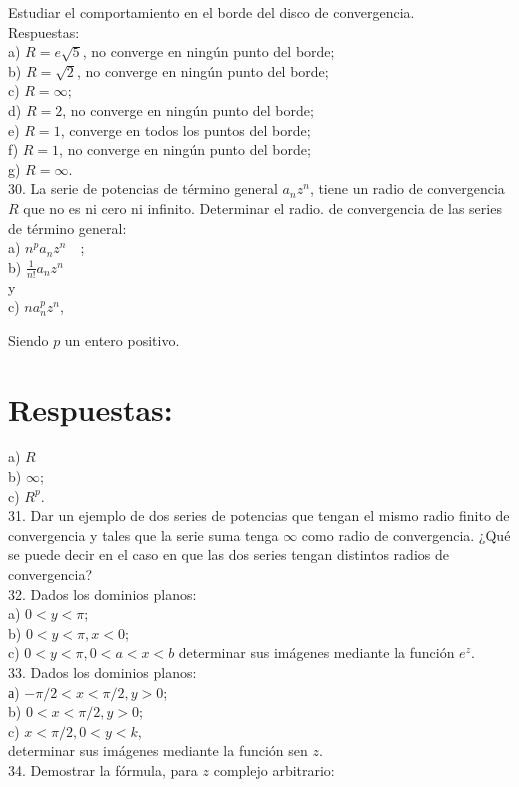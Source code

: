 \documentclass[10pt]{article}
\theoremstyle{plain}
\theoremstyle{definition}
\theoremstyle{remark}
\begin{document}
Estudiar el comportamiento en el borde del disco de convergencia.\\
Respuestas:\\
a) $R=e \sqrt{5}$, no converge en ningún punto del borde;\\
b) $R=\sqrt{2}$, no converge en ningún punto del borde;\\
c) $R=\infty$;\\
d) $R=2$, no converge en ningún punto del borde;\\
e) $R=1$, converge en todos los puntos del borde;\\
f) $R=1$, no converge en ningún punto del borde;\\
g) $R=\infty$.\\
30. La serie de potencias de término general $a_{n} z^{n}$, tiene un radio de convergencia $R$ que no es ni cero ni infinito. Determinar el radio. de convergencia de las series de término general:\\
a) $n^{p} a_{n} z^{n} \quad$;\\
b) $\frac{1}{n!} a_{n} z^{n}$\\
y\\
c) $n a_{n}^{p} z^{n}$,

Siendo $p$ un entero positivo.

\section*{Respuestas:}
a) $R$\\
b) $\infty$;\\
c) $R^{p}$.\\
31. Dar un ejemplo de dos series de potencias que tengan el mismo radio finito de convergencia y tales que la serie suma tenga $\infty$ como radio de convergencia. ¿Qué se puede decir en el caso en que las dos series tengan distintos radios de convergencia?\\
32. Dados los dominios planos:\\
a) $0<y<\pi$;\\
b) $0<y<\pi, x<0$;\\
c) $0<y<\pi, 0<a<x<b$ determinar sus imágenes mediante la función $e^{z}$.\\
33. Dados los dominios planos:\\
а) $-\pi / 2<x<\pi / 2, y>0$;\\
b) $0<x<\pi / 2, y>0$;\\
c) $x<\pi / 2,0<y<k$,\\
determinar sus imágenes mediante la función sen $z$.\\
34. Demostrar la fórmula, para $z$ complejo arbitrario:
\end{document}
